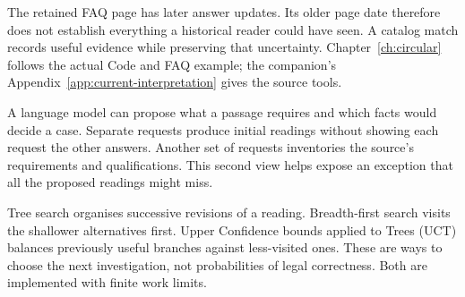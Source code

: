 The retained FAQ page has later answer updates. Its older page date therefore
does not establish everything a historical reader could have seen. A catalog
match records useful evidence while preserving that uncertainty.
Chapter~\ref{ch:circular} follows the actual Code and FAQ example;
the companion's Appendix~\ref{app:current-interpretation} gives the source tools.

\clearpage
{}
A language model can propose what a passage requires and which facts would
decide a case. Separate requests produce initial readings without showing each
request the other answers. Another set of requests inventories the source's
requirements and qualifications. This second view helps expose an exception
that all the proposed readings might miss.

\begin{MapDiagram}
\end{MapDiagram}

Tree search organises successive revisions of a reading. Breadth-first search
visits the shallower alternatives first. Upper Confidence bounds applied to
Trees (UCT) balances previously useful branches against less-visited ones.
These are ways to choose the next investigation, not probabilities of legal
correctness. Both are implemented with finite work limits.


